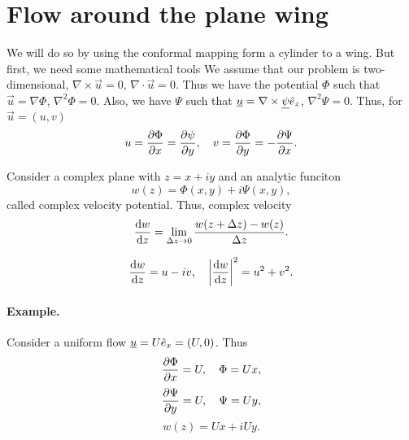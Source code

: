 \documentclass[../main.tex]{subfiles}
\begin{document}
  \section{Flow around the plane wing}
  We will do so by using the conformal mapping form a cylinder to a wing.
  But first, we need some mathematical tools
  We assume that our problem is two-dimensional, $\nabla \times \vec u = 0$, $ \nabla \cdot \vec u = 0$.
  Thus we have the potential $\Phi$ such that $\vec u = \nabla \Phi$, $\nabla^2 \Phi = 0$.
  Also, we have $\Psi$ such that $\underline{u} =  \nabla \times \underline{\psi} \hat{e}_z$, $\nabla^2 \Psi = 0$.
  Thus, for $\vec u = (u, v)$ 
  \begin{displaymath}
    u = \frac{\partial \Phi}{\partial x} = \frac{\partial \psi}{\partial y}, \quad v = \frac{\partial \Phi}{\partial y}  = - \frac{\partial \Psi}{\partial x}.
  \end{displaymath}

  Consider a complex plane with $z = x + i y$ and an analytic funciton 
  \begin{displaymath}
    w(z) = \Phi(x,y) + i \Psi(x,y),
  \end{displaymath}
  called complex velocity potential.
  Thus, complex velocity
  \begin{displaymath}
    \frac{\mathrm{d} w}{\mathrm{d} z} = \lim_{\Delta z \rightarrow 0} \frac{w(z + \Delta z) - w(z)}{\Delta z}.
  \end{displaymath}

  \begin{displaymath}
    \frac{\mathrm{d} w}{\mathrm{d} z} = u - i v, \quad \left| \frac{\mathrm{d} w}{\mathrm{d} z}\right|^2 = u^2 + v^2.
  \end{displaymath}

  \paragraph{Example.} Consider a uniform flow $\underline{u} = U \hat{e}_x = (U, 0)$.
  Thus
  \begin{displaymath}
    \frac{\partial \Phi}{\partial x} = U, \quad \Phi = U x,
  \end{displaymath}
  \begin{displaymath}
    \frac{\partial \Psi}{\partial y} = U, \quad \Psi = Uy, 
  \end{displaymath}
  \begin{displaymath}
    w(z) = U x + i U y.
  \end{displaymath}
\end{document}
